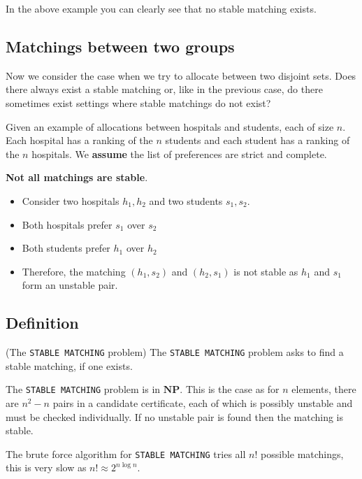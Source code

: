 \documentclass{article}
\newcommand{\NP}{\mathbf{NP}}
\begin{document}
In the above example you can clearly see that no stable matching exists.

\subsection{Matchings between two groups}

Now we consider the case when we try to allocate between two disjoint sets. Does there always exist a stable matching or, like in the previous case, do there sometimes exist settings where stable matchings do not exist?

Given an example of allocations between hospitals and students, each of size $n$. Each hospital has a ranking of the $n$ students and each student has a ranking of the $n$ hospitals. We \textbf{assume} the list of preferences are strict and complete.

\textbf{Not all matchings are stable}.

\begin{itemize}
  \item Consider two hospitals $h_{1},h_{2}$ and two students $s_{1},s_{2}$.
  \item Both hospitals prefer $s_{1}$ over $s_{2}$
  \item Both students prefer $h_{1}$ over $h_{2}$
  \item Therefore, the matching $(h_{1}, s_{2})$ and $(h_{2},s_{1})$ is not stable as $h_{1}$ and $s_{1}$ form an unstable pair.
\end{itemize}


\subsection{Definition}

\begin{definition}(The \texttt{STABLE MATCHING} problem)
  The \texttt{STABLE MATCHING} problem asks to find a stable matching, if one exists.
\end{definition}

The \texttt{STABLE MATCHING} problem is in $\NP$. This is the case as for $n$ elements, there are $n^{2}-n$ pairs in a candidate certificate, each of which is possibly unstable and must be checked individually. If no unstable pair is found then the matching is stable.

The brute force algorithm for \texttt{STABLE MATCHING} tries all $n!$  possible matchings, this is very slow as $n! \approx 2^{n\log n}$.
\end{document}
